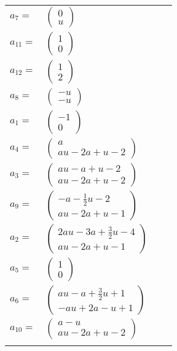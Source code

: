 \documentclass[1p]{elsarticle_modified}
\theoremstyle{definition}
\begin{document}
\begin{tabular}{m{7pt} m{180pt} m{7pt} m{180pt} }
\flushright $a_{7}=$&$\begin{pmatrix}0\\u\end{pmatrix}$ \\
\flushright $a_{11}=$&$\begin{pmatrix}1\\0\end{pmatrix}$ \\
\flushright $a_{12}=$&$\begin{pmatrix}1\\2\end{pmatrix}$ \\
\flushright $a_{8}=$&$\begin{pmatrix}- u\\- u\end{pmatrix}$ \\
\flushright $a_{1}=$&$\begin{pmatrix}-1\\0\end{pmatrix}$ \\
\flushright $a_{4}=$&$\begin{pmatrix}a\\a u-2 a+u-2\end{pmatrix}$ \\
\flushright $a_{3}=$&$\begin{pmatrix}a u- a+u-2\\a u-2 a+u-2\end{pmatrix}$ \\
\flushright $a_{9}=$&$\begin{pmatrix}- a-\frac{1}{2} u-2\\a u-2 a+u-1\end{pmatrix}$ \\
\flushright $a_{2}=$&$\begin{pmatrix}2 a u-3 a+\frac{3}{2} u-4\\a u-2 a+u-1\end{pmatrix}$ \\
\flushright $a_{5}=$&$\begin{pmatrix}1\\0\end{pmatrix}$ \\
\flushright $a_{6}=$&$\begin{pmatrix}a u- a+\frac{3}{2} u+1\\- a u+2 a- u+1\end{pmatrix}$ \\
\flushright $a_{10}=$&$\begin{pmatrix}a- u\\a u-2 a+u-2\end{pmatrix}$\\&\end{tabular}
\end{document}
